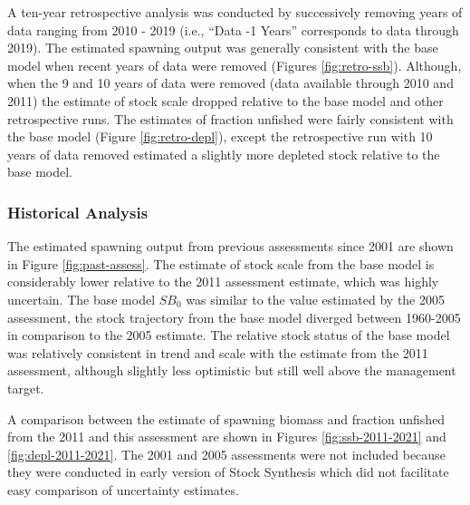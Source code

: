 \documentclass[11pt,
  english,
  a4paper,
]{article}
\begin{document}
A ten-year retrospective analysis was conducted by successively removing years of data ranging from 2010 - 2019 (i.e., ``Data -1 Years'' corresponds to data through 2019). The estimated spawning output was generally consistent with the base model when recent years of data were removed (Figures \ref{fig:retro-ssb}). Although, when the 9 and 10 years of data were removed (data available through 2010 and 2011) the estimate of stock scale dropped relative to the base model and other retrospective runs. The estimates of fraction unfished were fairly consistent with the base model (Figure \ref{fig:retro-depl}), except the retrospective run with 10 years of data removed estimated a slightly more depleted stock relative to the base model.

\leavevmode\tagmcend\tagstructend\par


\hypertarget{historical-analysis}{%
\subsubsection{Historical Analysis}\label{historical-analysis}}

\leavevmode\tagmcend\tagstructend


The estimated spawning output from previous assessments since 2001 are shown in Figure \ref{fig:past-assess}. The estimate of stock scale from the base model is considerably lower relative to the 2011 assessment estimate, which was highly uncertain. The base model {\(SB_0\)\leavevmode\tagmcend\tagstructend} was similar to the value estimated by the 2005 assessment, the stock trajectory from the base model diverged between 1960-2005 in comparison to the 2005 estimate. The relative stock status of the base model was relatively consistent in trend and scale with the estimate from the 2011 assessment, although slightly less optimistic but still well above the management target.

\leavevmode\tagmcend\tagstructend\par


A comparison between the estimate of spawning biomass and fraction unfished from the 2011 and this assessment are shown in Figures \ref{fig:ssb-2011-2021} and \ref{fig:depl-2011-2021}. The 2001 and 2005 assessments were not included because they were conducted in early version of Stock Synthesis which did not facilitate easy comparison of uncertainty estimates.
\end{document}
